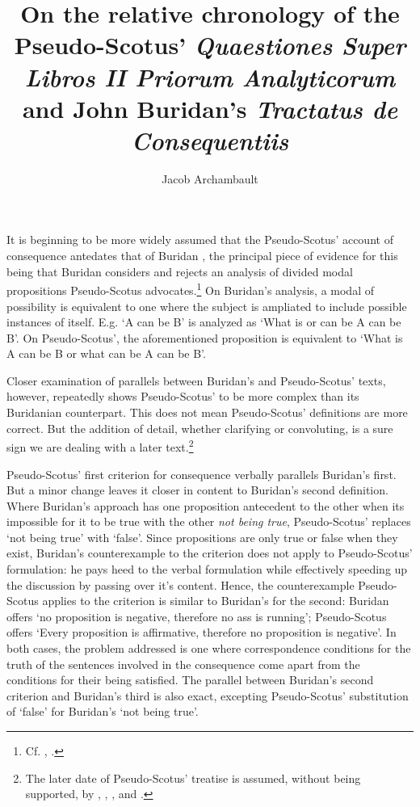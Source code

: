 \documentclass[]{article}
\title{On the relative chronology of the Pseudo-Scotus' \textit{Quaestiones Super Libros II Priorum Analyticorum} and John Buridan's \textit{Tractatus de Consequentiis}}
\author{Jacob Archambault}
\begin{document}
\maketitle

It is beginning to be more widely assumed that the Pseudo-Scotus' account of consequence antedates that of Buridan \cite[ch. 6]{Lagerlund2000} \cite[pp. 252-253]{Johnston2015}  \cite[pp. 4-5]{Read2015}, the principal piece of evidence for this being that Buridan considers and rejects an analysis of divided modal propositions Pseudo-Scotus advocates.\footnote{Cf. \cite[In anal. pr. I, q. 26, pp. 143-144]{Pseudo-Scotus1891}, \cite[TC II, 4, p. 97]{Buridan2015}.} On Buridan's analysis, a modal of possibility is equivalent to one where the subject is ampliated to include possible instances of itself. E.g. `A can be B' is analyzed as `What is or can be A can be B'. On Pseudo-Scotus', the aforementioned proposition is equivalent to `What is A can be B or what can be A can be B'.

Closer examination of parallels between Buridan's and Pseudo-Scotus' texts, however, repeatedly shows Pseudo-Scotus' to be more complex than its Buridanian counterpart. This does not mean Pseudo-Scotus' definitions are more correct. But the addition of detail, whether clarifying or convoluting, is a sure sign we are dealing with a later text.\footnote{The later date of Pseudo-Scotus' treatise is assumed, without being supported, by \cite{Boh1982}, \cite{King2001}, \cite{DutilhNovaes2008}, and \cite{Knuuttila2008}.}

Pseudo-Scotus' first criterion for consequence verbally parallels Buridan's first. But a minor change leaves it closer in content to Buridan's second definition. Where Buridan's approach has one proposition antecedent to the other when its impossible for it to be true with the other \textit{not being true}, Pseudo-Scotus' replaces `not being true' with `false'. Since propositions are only true or false when they exist, Buridan's counterexample to the criterion does not apply to Pseudo-Scotus' formulation: he pays heed to the verbal formulation while effectively speeding up the discussion by passing over it's content. Hence, the counterexample Pseudo-Scotus applies to the criterion is similar to Buridan's for the second: Buridan offers `no proposition is negative, therefore no ass is running'; Pseudo-Scotus offers `Every proposition is affirmative, therefore no proposition is negative'. In both cases, the problem addressed is one where correspondence conditions for the truth of the sentences involved in the consequence come apart from the conditions for their being satisfied. The parallel between Buridan's second criterion and Buridan's third is also exact, excepting Pseudo-Scotus' substitution of `false' for Buridan's `not being true'.
\end{document}
